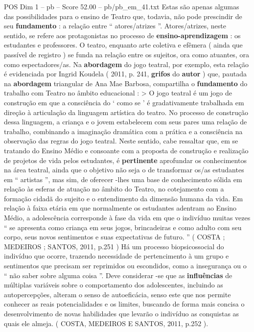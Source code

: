 \begin{textsample}{POS Dim 1 – pb – Score 52.00 – pb/pb\_em\_41.txt}
Estas são apenas algumas das possibilidades para o ensino de Teatro que, todavia, não pode prescindir de seu \textbf{fundamento} : a relação entre “ atores/atrizes ”.
Atores/atrizes, neste sentido, se refere aos protagonistas no processo de \textbf{ensino-aprendizagem} : os estudantes e professores.
O teatro, enquanto arte coletiva e efêmera ( ainda que passível de registro ) se funda na relação entre os sujeitos, ora como atuantes, ora como espectadores/as.
Na \textbf{abordagem} do jogo teatral, por exemplo, esta relação é evidenciada por Ingrid Koudela ( 2011, p. 241, \textbf{grifos} do \textbf{autor} ) que, pautada na \textbf{abordagem} triangular de Ana Mae Barbosa, compartilha o \textbf{fundamento} do trabalho com Teatro no âmbito educacional : > O jogo teatral é um jogo de construção em que a consciência do ‘ como se ’ é gradativamente trabalhada em direção à articulação da linguagem artística do teatro.
No processo de construção dessa linguagem, a criança e o jovem estabelecem com seus pares uma relação de trabalho, combinando a imaginação dramática com a prática e a consciência na observação das regras do jogo teatral.
Neste sentido, cabe ressaltar que, em se tratando do Ensino Médio e consoante com a proposta de construção e realização de projetos de vida pelos estudantes, é \textbf{pertinente} aprofundar os conhecimentos na área teatral, ainda que o objetivo não seja o de transformar os/as estudantes em “ artistas ”, mas sim, de oferecer -lhes uma base de conhecimento sólida em relação às esferas de atuação no âmbito do Teatro, no cotejamento com a formação cidadã do sujeito e o entendimento da dimensão humana da vida.
Em relação à faixa etária em que normalmente os estudantes adentram ao Ensino Médio, a adolescência corresponde à fase da vida em que o indivíduo muitas vezes “ se apresenta como criança em seus jogos, brincadeiras e como adulto com seu corpo, seus novos sentimentos e suas expectativas de futuro. ” ( COSTA ; MEDEIROS ; SANTOS, 2011, p.251 ) Há um processo biopsicossocial do indivíduo que ocorre, trazendo necessidade de pertencimento à um grupo e sentimentos que precisam ser reprimidos ou escondidos, como a insegurança ou o “ não saber sobre alguma coisa ”.
Deve considerar -se que as \textbf{influências} de múltiplas variáveis sobre o comportamento dos adolescentes, incluindo as autopercepções, alteram o senso de autoeficácia, senso este que nos permite conhecer as reais potencialidades e os limites, buscando de forma mais concisa o desenvolvimento de novas habilidades que levarão o indivíduo as conquistas as quais ele almeja. ( COSTA, MEDEIROS E SANTOS, 2011, p.252 ).

\end{textsample}
